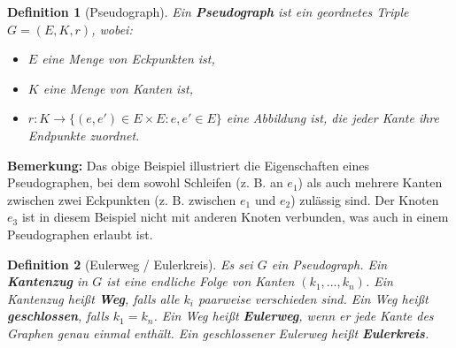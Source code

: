 \documentclass[a4paper,12pt]{article}
\theoremstyle{break}
\newtheorem{definition}{Definition}[section]
\begin{document}
\begin{definition}[Pseudograph]
Ein \textbf{Pseudograph} ist ein geordnetes Triple \( G = (E, K, r) \), wobei:
\begin{itemize}
    \item \( E \) eine Menge von Eckpunkten ist,
    \item \( K \) eine Menge von Kanten ist,
    \item \( r: K \to \{(e, e') \in E \times E : e, e' \in E\} \) eine Abbildung ist, die jeder Kante ihre Endpunkte zuordnet.
\end{itemize}
\end{definition}

\begin{center}
\end{center}

\textbf{Bemerkung:} Das obige Beispiel illustriert die Eigenschaften eines Pseudographen, bei dem sowohl Schleifen (z. B. an \(e_1\)) als auch mehrere Kanten zwischen zwei Eckpunkten (z. B. zwischen \(e_1\) und \(e_2\)) zulässig sind. Der Knoten \( e_3 \) ist in diesem Beispiel nicht mit anderen Knoten verbunden, was auch in einem Pseudographen erlaubt ist.

\begin{definition}[Eulerweg / Eulerkreis]
Es sei \( G \) ein Pseudograph. Ein \textbf{Kantenzug} in \( G \) ist eine endliche Folge von Kanten \( (k_1, \dots, k_n) \). Ein Kantenzug heißt \textbf{Weg}, falls alle \( k_i \) paarweise verschieden sind. Ein Weg heißt \textbf{geschlossen}, falls \( k_1 = k_n \). Ein Weg heißt \textbf{Eulerweg}, wenn er jede Kante des Graphen genau einmal enthält. Ein geschlossener Eulerweg heißt \textbf{Eulerkreis}.
\end{definition}
\end{document}
